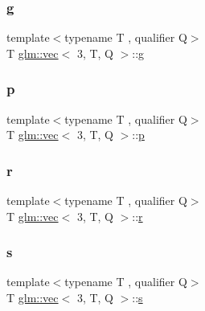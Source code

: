 \subsubsection{\texorpdfstring{g}{g}}
{\footnotesize\ttfamily template$<$typename T , qualifier Q$>$ \\
T \hyperlink{structglm_1_1vec}{glm\+::vec}$<$ 3, T, Q $>$\+::\hyperlink{_s_d_l__opengl__glext_8h_acaceb3a655ff28b75259860bcb868f9f}{g}}

\mbox{\label{structglm_1_1vec_3_013_00_01_t_00_01_q_01_4_acc882ded9421aad1b65564cde0ca1411}} 
\subsubsection{\texorpdfstring{p}{p}}
{\footnotesize\ttfamily template$<$typename T , qualifier Q$>$ \\
T \hyperlink{structglm_1_1vec}{glm\+::vec}$<$ 3, T, Q $>$\+::\hyperlink{_s_d_l__opengl__glext_8h_aa5367c14d90f462230c2611b81b41d23}{p}}

\mbox{\label{structglm_1_1vec_3_013_00_01_t_00_01_q_01_4_a7c3057b389465e2d02536d22ae2c1110}} 
\subsubsection{\texorpdfstring{r}{r}}
{\footnotesize\ttfamily template$<$typename T , qualifier Q$>$ \\
T \hyperlink{structglm_1_1vec}{glm\+::vec}$<$ 3, T, Q $>$\+::\hyperlink{_s_d_l__opengl_8h_a42ce7cdc612e53abee15043f80220d97}{r}}

\mbox{\label{structglm_1_1vec_3_013_00_01_t_00_01_q_01_4_ab09b6a68cfa21e42185cd4aff2a7c55e}} 
\subsubsection{\texorpdfstring{s}{s}}
{\footnotesize\ttfamily template$<$typename T , qualifier Q$>$ \\
T \hyperlink{structglm_1_1vec}{glm\+::vec}$<$ 3, T, Q $>$\+::\hyperlink{_s_d_l__opengl_8h_a4af680a6c683f88ed67b76f207f2e6e4}{s}}

